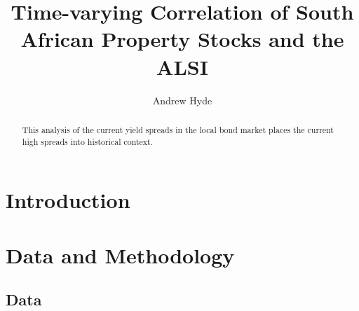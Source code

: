 \documentclass[11pt,preprint, authoryear]{elsarticle}
\numberwithin{equation}{section}
\numberwithin{figure}{section}
\numberwithin{table}{section}
\begin{document}
\begin{frontmatter}  %

\title{Time-varying Correlation of South African Property Stocks and the
ALSI}





\author[Add1]{Andrew Hyde}





\address[Add1]{Stellenbosch University, South Africa}


\begin{abstract}
\small{
This analysis of the current yield spreads in the local bond market
places the current high spreads into historical context.
}
\end{abstract}

\vspace{1cm}





\vspace{0.5cm}

\end{frontmatter}



\pagestyle{fancy}
\chead{}
\rhead{}
\lfoot{}
\lhead{}
\cfoot{}


\headsep 35pt %




\hypertarget{introduction}{%
\section{\texorpdfstring{Introduction
\label{Introduction}}{Introduction }}\label{introduction}}

\hypertarget{data-and-methodology}{%
\section{\texorpdfstring{Data and Methodology
\label{Methodology}}{Data and Methodology }}\label{data-and-methodology}}

\hypertarget{data}{%
\subsection{Data}\label{data}}
\end{document}
